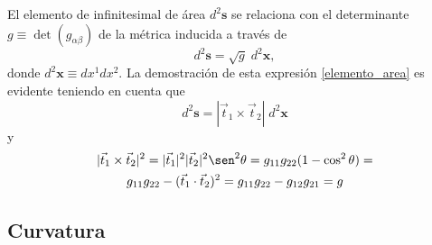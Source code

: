 El elemento de infinitesimal de área $d^2\mathbf{s}$ se relaciona con el
determinante $g\equiv\det(g_{\alpha\beta})$ de la métrica inducida a través de
\begin{equation}\label{elemento_area}
d^2\mathbf{s}=\sqrt{g}\;d^2\mathbf{x},
\end{equation}
donde $d^2\mathbf{x}\equiv dx^1dx^2$. La demostración de esta expresión
\eqref{elemento_area} es evidente teniendo en cuenta que
\begin{equation*}
d^2\mathbf{s}=|\vec{t}_1\times\vec{t}_2|\;d^2\mathbf{x}
\end{equation*}
y
\begin{multline*}
|\vec{t}_1\times\vec{t}_2|^2=|\vec{t}_1|^2|\vec{t}_2|^2\sen^2
\theta=g_{11}g_{22}(1-\cos^2 \theta)=\\
g_{11}g_{22}-(\vec{t}_1\cdot\vec{t}_2)^2=g_{11}g_{22}-g_{12}g_{21}=g
\end{multline*}

\subsection{Curvatura}


